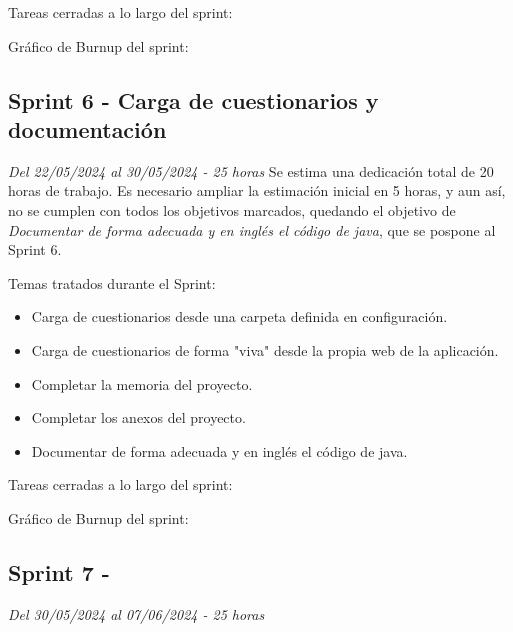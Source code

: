 Tareas cerradas a lo largo del sprint:

Gráfico de Burnup del sprint:

\subsection{Sprint 6 - Carga de cuestionarios y documentación}
\textit{Del 22/05/2024 al 30/05/2024 - 25 horas}
Se estima una dedicación total de 20 horas de trabajo.
Es necesario ampliar la estimación inicial en 5 horas, y aun así, no se cumplen con todos los objetivos marcados, quedando el objetivo de \textit{Documentar de forma adecuada y en inglés el código de java}, que se pospone al Sprint 6.

Temas tratados durante el Sprint:
\begin{itemize}
	\item
	Carga de cuestionarios desde una carpeta definida en configuración.
	\item
	Carga de cuestionarios de forma "viva" desde la propia web de la aplicación.
	\item
	Completar la memoria del proyecto.
	\item
	Completar los anexos del proyecto.
	\item
	Documentar de forma adecuada y en inglés el código de java.
\end{itemize}

Tareas cerradas a lo largo del sprint:

Gráfico de Burnup del sprint:


\subsection{Sprint 7 - }
\textit{Del 30/05/2024 al 07/06/2024 - 25 horas}

